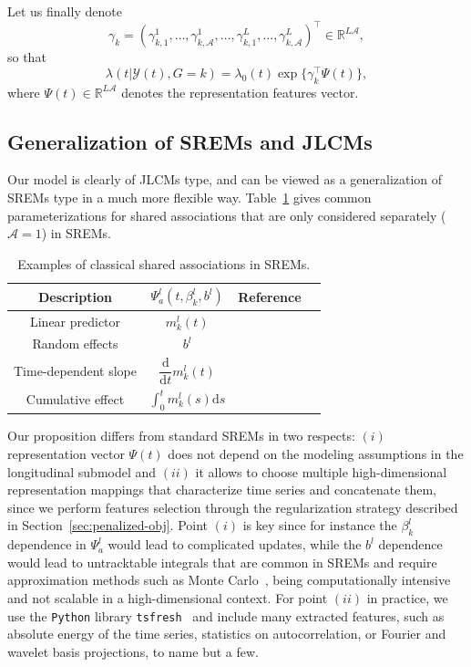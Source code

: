 \documentclass[11pt]{article}
\newcommand{\dd}{\mathrm{d}}
\newcommand{\cY}{\mathcal Y}
\newcommand{\cA}{\mathcal A}
\newcommand{\R}{\mathds R}
\begin{document}
Let us finally denote
\[\gamma_k= (\gamma_{k,1}^1, \ldots, \gamma_{k,\cA}^1, \ldots, \gamma_{k,1}^L, \ldots, \gamma_{k,\cA}^L )^\top \in \R^{L\cA}, \] so that
\begin{equation}
  \label{eq:def-asso-features}
  \lambda(t|\cY(t), G = k) = \lambda_0(t) \exp \big\{\gamma_k^\top \Psi(t) \big\},
\end{equation}
where $\Psi(t) \in \R^{L\cA}$ denotes the representation features vector.

\subsection{Generalization of SREMs and JLCMs}
 
Our model is clearly of JLCMs type, and can be viewed as a generalization of SREMs type in a much more flexible way. Table~\ref{table:shared_associations} gives common parameterizations for shared associations that are only considered separately ($\cA=1$) in SREMs.
\begin{table}[htb]
\centering
\begin{tabular}{cccc}
\toprule
Description & $\Psi_a^l(t, \beta_k^l, b^l)$  & Reference \\
\midrule
Linear predictor & $m_k^l(t)$ & \citet{chi2006joint} \\ [.15cm]
Random effects & $b^l$  & \citet{hatfield2011joint} \\
Time-dependent slope & $\dfrac{\dd}{\dd t} m_k^l(t)$ & \citet{rizopoulos2011bayesian} \\ [.3cm]
Cumulative effect & $\int_0^t m_k^l(s) \dd s$ & \citet{andrinopoulou2017combined} \\ [.1cm]
 \bottomrule
\end{tabular}
\caption[]{Examples of classical shared associations in SREMs.}
\label{table:shared_associations}
\end{table}

Our proposition differs from standard SREMs in two respects: $(i)$ representation vector $\Psi(t)$ does not depend on the modeling assumptions in the longitudinal submodel and $(ii)$ it allows to choose multiple high-dimensional representation mappings that characterize time series and concatenate them, since we perform features selection through the regularization strategy described in Section~\ref{sec:penalized-obj}. Point $(i)$ is key since for instance the $\beta_k^l$ dependence in $\Psi_a^l$ would lead to complicated updates, while the $b^l$ dependence would lead to untracktable integrals that are common in SREMs and require approximation methods such as Monte Carlo~\citep{hickey2018joinerml}, being computationally intensive and not scalable in a high-dimensional context. For point $(ii)$ in practice, we use the \texttt{Python} library \texttt{tsfresh}~\citep{christ2018time} and include many extracted features, such as absolute energy of the time series, statistics on autocorrelation, or Fourier and wavelet basis projections, to name but a few.
\end{document}
